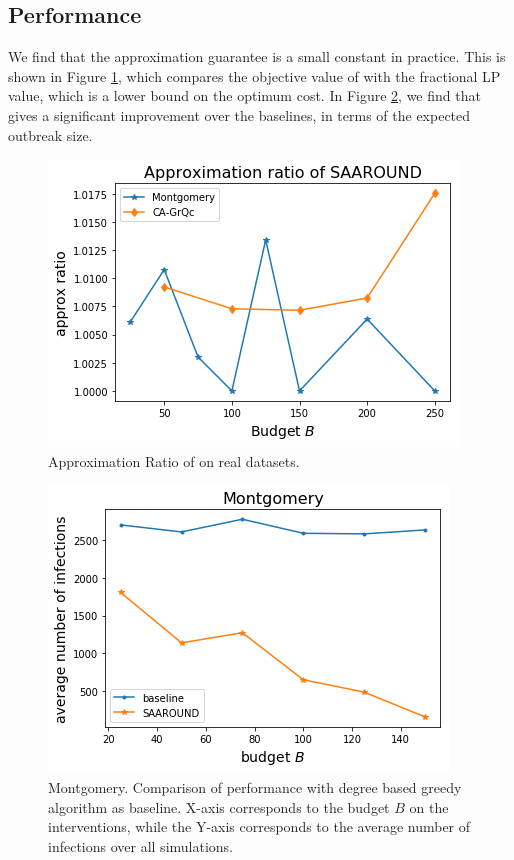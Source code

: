 \subsection{Performance}
We find that the approximation guarantee is a small constant in practice. This is shown in Figure \ref{fig:approx}, which compares the objective value of \algo{} with the fractional LP value, which is a lower bound on the optimum cost. In Figure \ref{fig:baseline}, we find that \algo{} gives a significant improvement over the baselines, in terms of the expected outbreak size.
\begin{figure}[!h]
    \centering
    \includegraphics[scale = 0.4]{figures/approx.png}
    \caption{Approximation Ratio of \algo{} on real datasets.}
    \label{fig:approx}
\end{figure}
 

\begin{figure}[!h]
    \centering
    \includegraphics[scale = 0.5]{figures/baslinecomp.png}
    \caption{Montgomery. Comparison of \algo{} performance with degree based greedy algorithm as baseline. X-axis corresponds to the budget $B$ on the interventions, while the Y-axis corresponds to the average number of infections over all simulations. 
    }
    \label{fig:baseline}
\end{figure}
 
